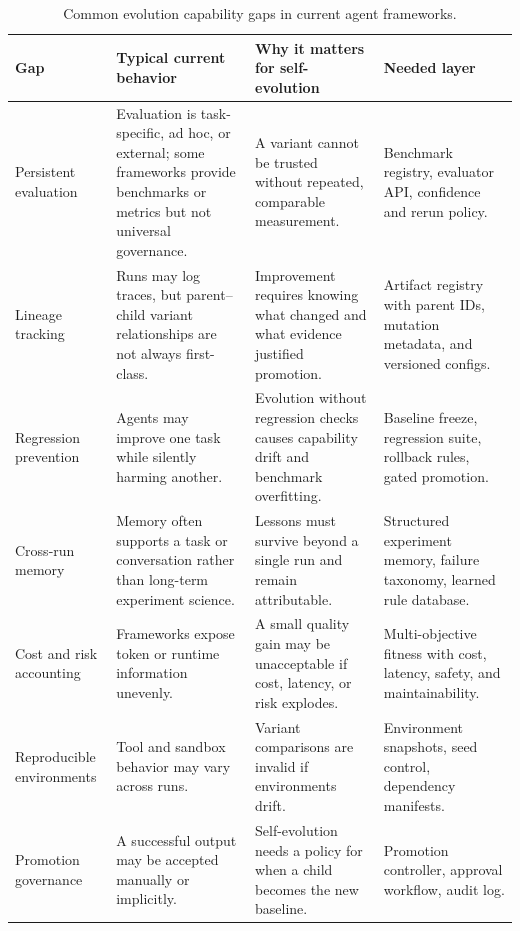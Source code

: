 \begin{table}[t]
\centering
\TableTight
\caption{Common evolution capability gaps in current agent frameworks.}
\label{tab:evolution-gaps}
\begin{tabularx}{\textwidth}{@{}L{0.18\textwidth}L{0.30\textwidth}Y L{0.20\textwidth}@{}}
\toprule
\textbf{Gap} & \textbf{Typical current behavior} & \textbf{Why it matters for self-evolution} & \textbf{Needed layer} \\
\midrule
Persistent evaluation & Evaluation is task-specific, ad hoc, or external; some frameworks provide benchmarks or metrics but not universal governance. & A variant cannot be trusted without repeated, comparable measurement. & Benchmark registry, evaluator API, confidence and rerun policy. \\
Lineage tracking & Runs may log traces, but parent--child variant relationships are not always first-class. & Improvement requires knowing what changed and what evidence justified promotion. & Artifact registry with parent IDs, mutation metadata, and versioned configs. \\
Regression prevention & Agents may improve one task while silently harming another. & Evolution without regression checks causes capability drift and benchmark overfitting. & Baseline freeze, regression suite, rollback rules, gated promotion. \\
Cross-run memory & Memory often supports a task or conversation rather than long-term experiment science. & Lessons must survive beyond a single run and remain attributable. & Structured experiment memory, failure taxonomy, learned rule database. \\
Cost and risk accounting & Frameworks expose token or runtime information unevenly. & A small quality gain may be unacceptable if cost, latency, or risk explodes. & Multi-objective fitness with cost, latency, safety, and maintainability. \\
Reproducible environments & Tool and sandbox behavior may vary across runs. & Variant comparisons are invalid if environments drift. & Environment snapshots, seed control, dependency manifests. \\
Promotion governance & A successful output may be accepted manually or implicitly. & Self-evolution needs a policy for when a child becomes the new baseline. & Promotion controller, approval workflow, audit log. \\
\bottomrule
\end{tabularx}
\end{table}

